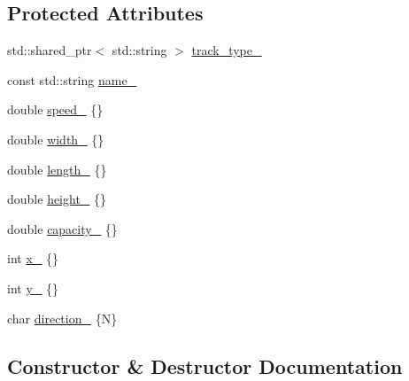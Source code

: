\subsection*{Protected Attributes}
\begin{DoxyCompactItemize}
\item 
std\+::shared\+\_\+ptr$<$ std\+::string $>$ \hyperlink{classfp_1_1_land_based_tracked_a2e5f75cdd135af0f33a369058de3b15c}{track\+\_\+type\+\_\+}
\item 
const std\+::string \hyperlink{classfp_1_1_land_based_tracked_abf54193cc934e3e3833a2ed3767eee9a}{name\+\_\+}
\item 
double \hyperlink{classfp_1_1_land_based_tracked_ae4203781ac58381e57fe189d6bf9908a}{speed\+\_\+} \{\}
\item 
double \hyperlink{classfp_1_1_land_based_tracked_ac3f7d3a782facd141e5a604a6ba150f8}{width\+\_\+} \{\}
\item 
double \hyperlink{classfp_1_1_land_based_tracked_ab6a7476275dfee103cfd8b1f5817d79a}{length\+\_\+} \{\}
\item 
double \hyperlink{classfp_1_1_land_based_tracked_a5f9e0d15ade5738525ccef9d8899a1b2}{height\+\_\+} \{\}
\item 
double \hyperlink{classfp_1_1_land_based_tracked_a608f59273d6f0882809fa11dbb1ca325}{capacity\+\_\+} \{\}
\item 
int \hyperlink{classfp_1_1_land_based_tracked_a8001133ebf0739a851c283248b7bf3f3}{x\+\_\+} \{\}
\item 
int \hyperlink{classfp_1_1_land_based_tracked_ae8f41c1bd340a84c7704b3bd7281ae79}{y\+\_\+} \{\}
\item 
char \hyperlink{classfp_1_1_land_based_tracked_a2efd39a637cc76891f6e8fd1eb84420e}{direction\+\_\+} \{\textquotesingle{}N\textquotesingle{}\}
\end{DoxyCompactItemize}


\subsection{Constructor \& Destructor Documentation}
\mbox{\label{classfp_1_1_land_based_tracked_adde9b81138a39b13b4b05386c1a6b3a3}} 
